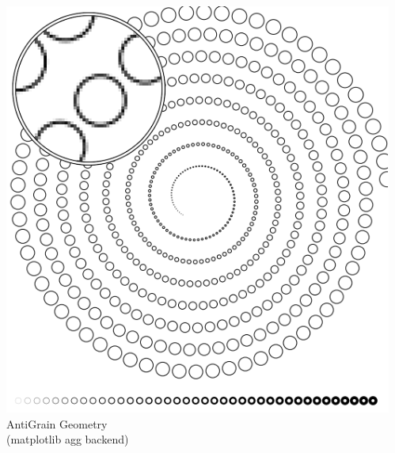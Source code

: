 \documentclass[10pt]{beamer}
\begin{document}
\begin{frame}
  \begin{block}{}
    \begin{columns}
      \begin{column}{.225\textwidth}
        \begin{center}
        \includegraphics[width=\textwidth]{agg-circles-detail}\\
        \tiny AntiGrain Geometry\\(matplotlib agg backend)
        \end{center}
      \end{column}
      \begin{column}{.225\textwidth}
        \begin{center}

\end{center}
\end{column}
\end{columns}
\end{block}
\end{frame}
\end{document}
